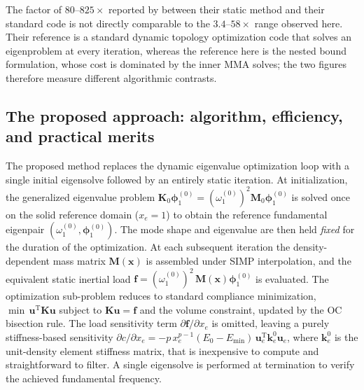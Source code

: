 \documentclass[pdflatex,lineno,sn-mathphys-ay]{sn-jnl}
\begin{document}
The factor of $80$--$825\times$ reported by \citet[Table~1]{Yuksel2025} between their static method and their standard code is not directly comparable to the $3.4$--$58\times$ range observed here. Their reference is a standard dynamic topology optimization code that solves an eigenproblem at every iteration, whereas the reference here is the nested bound formulation, whose cost is dominated by the inner MMA solves; the two figures therefore measure different algorithmic contrasts.

\subsection{The proposed approach: algorithm, efficiency, and practical merits}

The proposed method replaces the dynamic eigenvalue optimization loop with a single initial eigensolve followed by an entirely static iteration.  At initialization, the generalized eigenvalue problem $\mathbf{K}_0\boldsymbol{\phi}_1^{(0)} =
(\omega_1^{(0)})^2\mathbf{M}_0\boldsymbol{\phi}_1^{(0)}$ is solved once on the solid reference domain ($x_e = 1$) to obtain the reference fundamental eigenpair $(\omega_1^{(0)},\boldsymbol{\phi}_1^{(0)})$.  The mode shape and eigenvalue are then held \emph{fixed} for the duration of the optimization.  At each subsequent iteration the density-dependent mass matrix $\mathbf{M}(\mathbf{x})$ is assembled under SIMP interpolation, and the equivalent static inertial load $\mathbf{f} = (\omega_1^{(0)})^2\,\mathbf{M}(\mathbf{x})\boldsymbol{\phi}_1^{(0)}$ is evaluated.  The optimization sub-problem reduces to standard compliance minimization,
$\min\,\mathbf{u}^\mathrm{T}\mathbf{K}\mathbf{u}$ subject to $\mathbf{K}\mathbf{u}=\mathbf{f}$ and the volume constraint, updated by the OC bisection rule.  The load sensitivity term $\partial\mathbf{f}/\partial x_e$ is omitted, leaving a purely stiffness-based sensitivity $\partial c/\partial x_e = -p\,x_e^{p-1}(E_0 - E_\mathrm{min})\,\mathbf{u}_e^\mathrm{T}\mathbf{k}_e^0\mathbf{u}_e$, where $\mathbf{k}_e^0$ is the unit-density element stiffness matrix, that is inexpensive to compute and straightforward to filter.  A single eigensolve is performed at termination to verify the achieved fundamental frequency.
\end{document}
